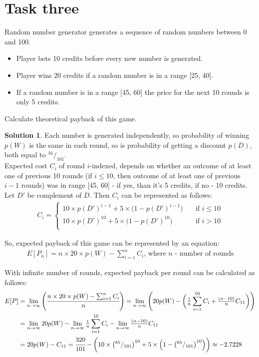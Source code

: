 \documentclass[11pt]{article}
\theoremstyle{definition}
\newtheorem*{solution}{Solution}
\begin{document}
\section{Task three}
Random number generator generates a sequence of random numbers between 0 and 100. 
\begin{itemize}
\item Player bets 10 credits before every new number is generated. 
\item Player wins 20 credits if a random number is in a range [25, 40]. 
\item If a random number is in a range [45, 60] the price for the next 10 rounds is only 5 credits. 
\end{itemize}
Calculate theoretical payback of this game. 

\begin{solution}
Each number is generated independently, so probability of winning $p(W)$ is the same in each round, so is probability of getting a discount $p(D)$, both equal to ${^{16}}/_{101}$. \\
Expected cost $C_i$ of round $i$-indexed, depends on whether an outcome of at least one of previous 10 rounds (if $i \leq 10$, then outcome of at least one of previous $i-1$ rounds) was in range [45, 60] - if yes, than it's 5 credits, if no - 10 credits. Let $D'$ be complement of $D$. Then $C_i$ can be represented as follows:
\begin{align*}
C_i = 
  \begin{cases}
    10\times p(D')^{i-1} + 5\times \big( 1 - p(D')^{i-1} \big)   & \quad \text{if } i \leq 10\\
    10\times p(D')^{10}  + 5\times \big( 1 - p(D')^{10}  \big)   & \quad \text{if } i > 10\\
  \end{cases}
\end{align*}

So, expected payback of this game can be represented by an equation:
\begin{align*}
E[P_n] = n \times 20\times p(W) - \sum_{i=1}^{n} C_i \text{, where } n \text{ - number of rounds}
\end{align*}

With infinite number of rounds, expected payback per round can be calculated as follows:
\begin{align*}
E[P] &= \lim_{n \rightarrow \infty} \Bigg(\cfrac{n \times 20\times p(W) - \sum_{i=1}^{n} C_i}{n} \Bigg) 
= \lim_{n \rightarrow \infty} \Bigg(20p(W) - \bigg(\tfrac{1}{n}\sum_{i=1}^{10} C_i + \tfrac{(n-10)}{n}C_{11} \bigg)\Bigg) \\
&= \lim_{n \rightarrow \infty}20p(W) - \lim_{n \rightarrow \infty} \tfrac{1}{n}\sum_{i=1}^{10} C_i - \lim_{n \rightarrow \infty} \tfrac{(n-10)}{n}C_{11} \\
&= 20p(W) - C_{11} 
= \cfrac{320}{101} - \bigg( 10\times\big( {^{85}}/_{101} \big)^{10} + 5\times \Big(1 - \big( {^{85}}/_{101} \big)^{10}\Big)\bigg) \approx -2.7228
\end{align*}

\end{solution}
\end{document}
